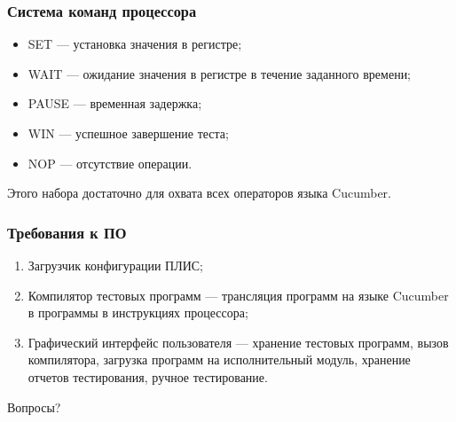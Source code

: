 \documentclass{beamer}
\begin{document}

\begin{frame}
\frametitle{Система команд процессора}
\begin{itemize}
\item SET --- установка значения в регистре;
\item WAIT --- ожидание значения в регистре в течение заданного времени;
\item PAUSE --- временная задержка;
\item WIN --- успешное завершение теста;
\item NOP --- отсутствие операции.
\end{itemize}
Этого набора достаточно для охвата всех операторов языка Cucumber.
\end{frame}



\begin{frame}
\frametitle{Требования к ПО}
\begin{enumerate}
\item Загрузчик конфигурации ПЛИС;
\item Компилятор тестовых программ --- трансляция программ на языке Cucumber в программы в инструкциях процессора;
\item Графический интерфейс пользователя --- хранение тестовых программ, вызов компилятора, загрузка программ на исполнительный модуль, хранение отчетов тестирования, ручное тестирование.
\end{enumerate}
\end{frame}


\begin{frame}
\Huge{\centerline{Вопросы?}}
\end{frame}

\end{document}
